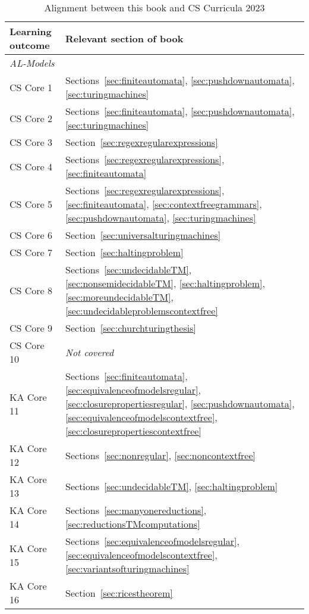 \begin{table}[p]
\centering
\caption{Alignment between this book and CS Curricula 2023}
\label{tab:learningoutcomes}
\begin{tabular}{p{4cm} p{5cm}}
\toprule
\textbf{Learning outcome}		& \textbf{Relevant section of book} \\
\midrule
\textit{AL-Models}			& \\
CS Core 1					& Sections~\ref{sec:finiteautomata}, \ref{sec:pushdownautomata}, \ref{sec:turingmachines} \\
CS Core 2					& Sections~\ref{sec:finiteautomata}, \ref{sec:pushdownautomata}, \ref{sec:turingmachines} \\
CS Core 3					& Section~\ref{sec:regexregularexpressions} \\
CS Core 4					& Sections~\ref{sec:regexregularexpressions}, \ref{sec:finiteautomata} \\
CS Core 5					& Sections~\ref{sec:regexregularexpressions}, \ref{sec:finiteautomata}, \ref{sec:contextfreegrammars}, \ref{sec:pushdownautomata}, \ref{sec:turingmachines} \\
CS Core 6					& Section~\ref{sec:universalturingmachines} \\
CS Core 7					& Section~\ref{sec:haltingproblem} \\
CS Core 8					& Sections~\ref{sec:undecidableTM}, \ref{sec:nonsemidecidableTM}, \ref{sec:haltingproblem}, \ref{sec:moreundecidableTM}, \ref{sec:undecidableproblemscontextfree} \\
CS Core 9					& Section~\ref{sec:churchturingthesis} \\
CS Core 10				& \textcolor{\neutralcolour}{\textit{Not covered}} \\
KA Core 11				& Sections~\ref{sec:finiteautomata}, \ref{sec:equivalenceofmodelsregular}, \ref{sec:closurepropertiesregular}, \ref{sec:pushdownautomata}, \ref{sec:equivalenceofmodelscontextfree}, \ref{sec:closurepropertiescontextfree} \\
KA Core 12				& Sections~\ref{sec:nonregular}, \ref{sec:noncontextfree} \\
KA Core 13				& Sections~\ref{sec:undecidableTM}, \ref{sec:haltingproblem}\\
KA Core 14				& Sections~\ref{sec:manyonereductions}, \ref{sec:reductionsTMcomputations} \\
KA Core 15				& Sections~\ref{sec:equivalenceofmodelsregular}, \ref{sec:equivalenceofmodelscontextfree}, \ref{sec:variantsofturingmachines} \\
KA Core 16				& Section~\ref{sec:ricestheorem} \\

\end{tabular}
\end{table}
